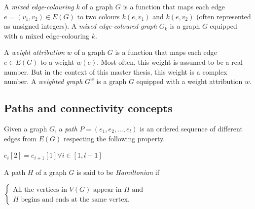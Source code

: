\begin{definition}
    \label{def:mixed_edge_coloured_graph}
    A \textit{mixed edge-colouring} $k$ of a graph $G$ is a function that maps each edge $e = (v_1, v_2) \in E(G)$ to two colours $k(e, v_1)$ and $k(e, v_2)$ (often represented as unsigned integers).
    A \textit{mixed edge-coloured graph} $G_k$ is a graph $G$ equipped with a mixed edge-colouring $k$.
\end{definition}

\begin{definition}
    \label{def:weighted_graph}
    A \textit{weight attribution} $w$ of a graph $G$ is a function that maps each edge $e \in E(G)$ to a weight $w(e)$.
    Most often, this weight is assumed to be a real number.
    But in the context of this master thesis, this weight is a complex number.
    A \textit{weighted graph} $G^w$ is a graph $G$ equipped with a weight attribution $w$.
\end{definition}


\subsection{Paths and connectivity concepts}
\label{subsec:paths-and-connectivity-concepts}

\begin{definition}[Path]
    \label{def:path}
    Given a graph $G$, a \textit{path} $P = (e_1, e_2, \dots, e_l)$ is an ordered sequence of different edges from $E(G)$ respecting the following property.
    \begin{center}
        $e_i[2] = e_{i + 1}[1] \forall i \in [1, l - 1]$
    \end{center}
\end{definition}

\begin{definition}
    \label{def:hamiltonian_path}
    A path $H$ of a graph $G$ is said to be \textit{Hamiltonian} if
    \begin{center}
        $\left\{\begin{array}{l}
            \mbox{All the vertices in } V(G) \mbox{ appear in } H \mbox{ and} \\
            H \mbox{ begins and ends at the same vertex.}
        \end{array}\right.$
    \end{center}
\end{definition}

